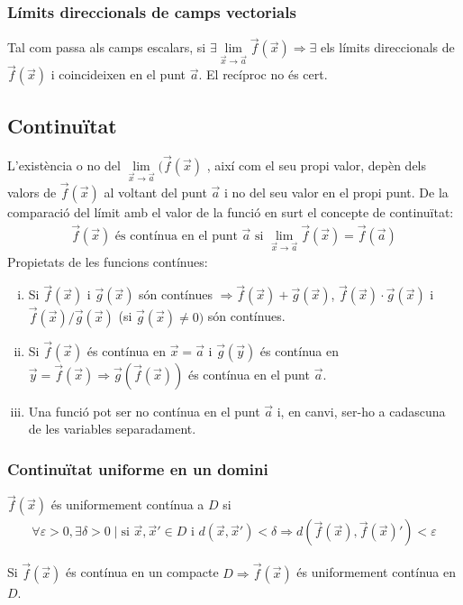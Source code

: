 \subsubsection*{Límits direccionals de camps vectorials}
Tal com passa als camps escalars, si $\exists \lim\limits_{\vec{x} \to \vec{a}} \vec{f}(\vec{x}) \Rightarrow \exists$ els límits direccionals de $\vec{f}(\vec{x})$ i coincideixen en el punt $\vec{a}$. El recíproc no és cert.

\subsection{Continuïtat}
L'existència o no del $\lim\limits_{\vec{x} \to \vec{a}} ( \vec{f}(\vec{x})$ , així com el seu propi valor, depèn dels valors de $\vec{f}(\vec{x})$ al voltant del punt $\vec{a}$ i no del seu valor en el propi punt. De la comparació del límit amb el valor de la funció en surt el concepte de continuïtat:
\begin{align}
    \vec{f}(\vec{x}) \text{ és contínua en el punt } \vec{a} \text{ si } \lim\limits_{\vec{x} \to \vec{a}} \vec{f}(\vec{x}) = \vec{f}(\vec{a})
\end{align}
Propietats de les funcions contínues:
\begin{enumerate}[i)]
    \item Si $\vec{f}(\vec{x})$ i $\vec{g}(\vec{x})$ són contínues $\Rightarrow \vec{f}(\vec{x}) + \vec{g}(\vec{x})$, $\vec{f}(\vec{x}) \cdot \vec{g}(\vec{x})$ i $\vec{f}(\vec{x}) / \vec{g}(\vec{x})$ (si $\vec{g}(\vec{x}) \neq 0)$ són contínues.
    \item Si $\vec{f}(\vec{x})$ és contínua en $\vec{x} = \vec{a}$ i $\vec{g}(\vec{y})$ és contínua en $\vec{y} = \vec{f}(\vec{x}) \Rightarrow \vec{g}(\vec{f}(\vec{x}))$ és contínua en el punt $\vec{a}$.
    \item Una funció pot ser no contínua en el punt $\vec{a}$ i, en canvi, ser-ho a cadascuna de les variables separadament.
\end{enumerate}

\subsubsection*{Continuïtat uniforme en un domini}
\begin{defi}
    $\vec{f}(\vec{x})$ és uniformement contínua a $D$ si
    \begin{align}
        \forall \varepsilon > 0, \exists \delta > 0 \mid \text{si } \vec{x}, \vec{x}' \in D \text{ i } d(\vec{x}, \vec{x}') < \delta \Rightarrow d(\vec{f}(\vec{x}), \vec{f}(\vec{x})') < \varepsilon
    \end{align}
\end{defi}
\begin{thm}
    Si $\vec{f}(\vec{x})$ és contínua en un compacte $D \Rightarrow \vec{f}(\vec{x})$ és uniformement contínua en $D$.
\end{thm}